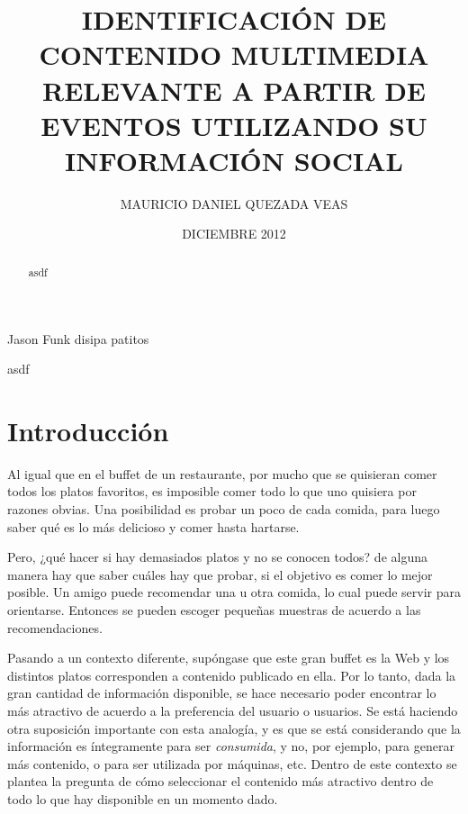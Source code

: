 \documentclass[upright, contnum]{umemoria}
\title{IDENTIFICACIÓN DE CONTENIDO MULTIMEDIA RELEVANTE A PARTIR DE EVENTOS UTILIZANDO SU INFORMACIÓN SOCIAL}
\author{MAURICIO DANIEL QUEZADA VEAS}
\date{DICIEMBRE 2012}
\begin{document}
\maketitle





\begin{abstract}
asdf
\end{abstract}

\begin{dedicatoria}
Jason Funk disipa patitos
\end{dedicatoria}

\begin{thanks}
asdf
\end{thanks}

\cleardoublepage
\tableofcontents

\mainmatter


\chapter{Introducción}
\label{sec-1}


Al igual que en el buffet de un restaurante, por mucho que se quisieran
comer todos los platos favoritos, es imposible comer todo lo que uno
quisiera por razones obvias. Una posibilidad es probar un poco de cada
comida, para luego saber qué es lo más delicioso y comer hasta
hartarse.

Pero, ¿qué hacer si hay demasiados platos y no se conocen todos? de
alguna manera hay que saber cuáles hay que probar, si el objetivo es
comer lo mejor posible. Un amigo puede recomendar una u otra comida,
lo cual puede servir para orientarse. Entonces se pueden escoger
pequeñas muestras de acuerdo a las recomendaciones.

Pasando a un contexto diferente, supóngase que este gran buffet es la
Web y los distintos platos corresponden a contenido publicado en
ella. Por lo tanto, dada la gran cantidad de información disponible,
se hace necesario poder encontrar lo más atractivo de acuerdo a la
preferencia del usuario o usuarios. Se está haciendo otra suposición
importante con esta analogía, y es que se está considerando que la
información es íntegramente para ser \emph{consumida}, y no, por ejemplo, para
generar más contenido, o para ser utilizada por máquinas, etc. Dentro de
este contexto se plantea la pregunta de cómo seleccionar el contenido
más atractivo dentro de todo lo que hay disponible en un momento dado.
\end{document}
